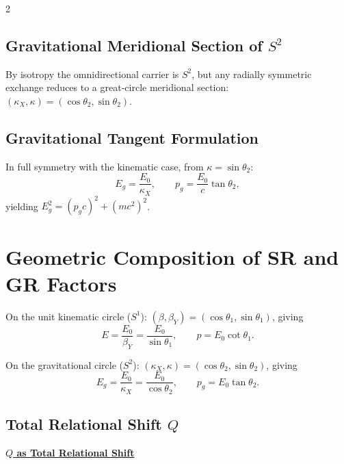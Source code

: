 \documentclass[10pt, a4paper]{article}
\begin{document}
\begin{multicols}{2}
\subsection{Gravitational Meridional Section of $S^2$}
By isotropy the omnidirectional carrier is $S^2$, but any radially symmetric exchange reduces to a great-circle meridional section: $(\kappa_X,\kappa)=(\cos\theta_2,\sin\theta_2)$.

\subsection{Gravitational Tangent Formulation}

In full symmetry with the kinematic case, from $\kappa = \sin\theta_{2}$:
\begin{equation}
    E_{g} = \frac{E_{0}}{\kappa_{X}}, \qquad
    p_g = \frac{E_{0}}{c}\tan\theta_{2},
\end{equation}
yielding $E_{g}^{2} = (p_gc)^{2} + (mc^{2})^{2}$.



\section{Geometric Composition of SR and GR Factors}
\hypertarget{sec:geometric_composition}{}\label{sec:geometric_composition}

On the unit kinematic circle ($S^1$): $(\beta,\beta_Y)=(\cos\theta_1,\sin\theta_1)$, giving
\[
E=\frac{E_0}{\beta_Y}=\frac{E_0}{\sin\theta_1}, \qquad
p=E_0\cot\theta_1.
\]

On the gravitational circle ($S^2$): $(\kappa_X,\kappa)=(\cos\theta_2,\sin\theta_2)$, giving
\[
E_g=\frac{E_0}{\kappa_X}=\frac{E_0}{\cos\theta_2}, \qquad
p_g=E_0\tan\theta_2.
\]

\subsection{Total Relational Shift $Q$}
\hypertarget{sec:DisQ}{}\label{sec:DisQ}

\begin{tcolorbox}[colback=gray!5, colframe=black!80!black, title=Desmos project]
\textbf{\href{https://www.desmos.com/geometry/2nkjtezjpi}{$Q$ as Total Relational Shift}}
\end{tcolorbox}


\end{multicols}
\end{document}
